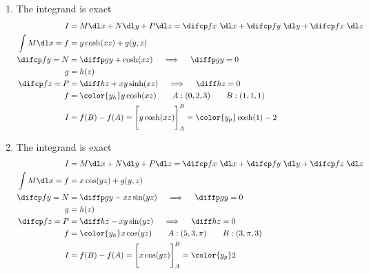 \begin{enumerate}
    \item The integrand is exact
          \begin{align}
              I                & = M \dl x + N \dl y + P \dl z =
              \difcp fx\ \dl x + \difcp fy\ \dl y
              + \difcp fz\ \dl z                                              \\
              \int M \dl x = f & = y\cosh(xz) + g(y, z)                       \\
              \difcp fy = N    & = \diffp gy + \cosh(xz)
              \quad \implies \quad  \diffp gy = 0                             \\
              g                & = h(z)                                       \\
              \difcp fz = P    & = \diff hz + xy \sinh(xz)
              \quad \implies \quad \diff hz = 0                               \\
              f                & = {\color{y_h} y\cosh(xz)}
              \qquad A : (0, 2, 3) \qquad B: (1, 1, 1)                        \\
              I                & = f(B) - f(A) = \Bigg[ y\cosh(xz) \Bigg]_A^B
              = \color{y_p} \cosh(1) - 2
          \end{align}

    \item The integrand is exact
          \begin{align}
              I                & = M \dl x + N \dl y + P \dl z =
              \difcp fx\ \dl x + \difcp fy\ \dl y
              + \difcp fz\ \dl z                                              \\
              \int M \dl x = f & = x \cos(yz) + g(y, z)                       \\
              \difcp fy = N    & = \diffp gy - xz \sin(yz)
              \quad \implies \quad  \diffp gy = 0                             \\
              g                & = h(z)                                       \\
              \difcp fz = P    & = \diff hz - xy \sin(yz)
              \quad \implies \quad \diff hz = 0                               \\
              f                & = {\color{y_h} x \cos(yz)}
              \qquad A : (5, 3, \pi) \qquad B: (3, \pi, 3)                    \\
              I                & = f(B) - f(A) = \Bigg[ x \cos(yz) \Bigg]_A^B
              = \color{y_p} 2
          \end{align}


\end{enumerate}
